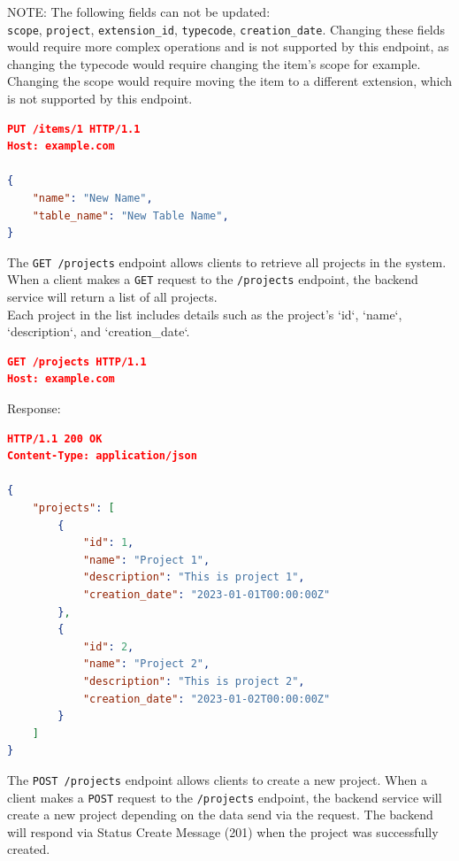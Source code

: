 \begin{mynote}
    NOTE: The following fields can not be updated: \\ \texttt{scope}, \texttt{project}, \texttt{extension\_id}, \texttt{typecode}, \texttt{creation\_date}.
    Changing these fields would require more complex operations and is not supported by this endpoint, as changing the typecode would require changing the item's scope for example.
    Changing the scope would require moving the item to a different extension, which is not supported by this endpoint.
\end{mynote}

\begin{lstlisting}[language=json,label={lst:lstlisting21}]
PUT /items/1 HTTP/1.1
Host: example.com

{
    "name": "New Name",
    "table_name": "New Table Name",
}

\end{lstlisting}


The \texttt{GET /projects} endpoint allows clients to retrieve all projects in the system.
When a client makes a \texttt{GET} request to the \texttt{/projects} endpoint, the backend service will return a list of all projects.
\\Each project in the list includes details such as the project's `id`, `name`, `description`, and `creation\_date`.

\begin{lstlisting}[language=json,label={lst:lstlisting11}]
GET /projects HTTP/1.1
Host: example.com
\end{lstlisting}

Response:

\begin{lstlisting}[language=json,label={lst:lstlisting12}]
HTTP/1.1 200 OK
Content-Type: application/json

{
    "projects": [
        {
            "id": 1,
            "name": "Project 1",
            "description": "This is project 1",
            "creation_date": "2023-01-01T00:00:00Z"
        },
        {
            "id": 2,
            "name": "Project 2",
            "description": "This is project 2",
            "creation_date": "2023-01-02T00:00:00Z"
        }
    ]
}
\end{lstlisting}


The \texttt{POST /projects} endpoint allows clients to create a new project.
When a client makes a \texttt{POST} request to the \texttt{/projects} endpoint, the backend service will create a new project depending on the data send via the request.
The backend will respond via Status Create Message (201) when the project was successfully created.

